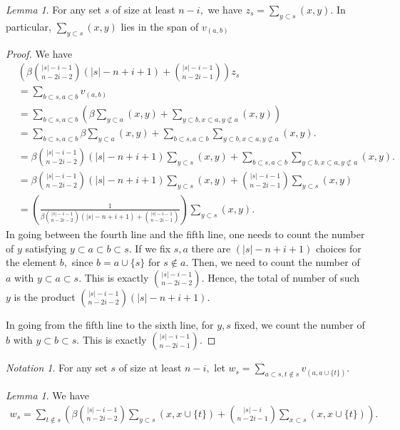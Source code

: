 \documentclass[10 pt]{amsart}
\theoremstyle{plain}
\theoremstyle{definition}
\theoremstyle{remark}
\numberwithin{equation}{section}
\newtheorem{lem}[thm]{Lemma}
\theoremstyle{remark}
\newtheorem{note}[thm]{Notation}
\begin{document}
\begin{lem}
\label{z_equivalence}
For any set $s$ of size at least $n-i,$ we have $z_s = \sum_{y \subset s}^{}(x, y).$ In particular, $\sum_{y \subset s}^{}(x, y)$ lies in the span of $v_{(a, b)}$
\end{lem}
\begin{proof}
We have 
\begin{align*}
	&\left(\beta\binom {|s|-i-1}{n-2i-2}(|s|-n+i+1)+\binom{|s|-i-1}{n-2i-1}\right) z_s \\
	&= \sum_{b\subset s,a \subset b}^{}v_{(a, b)}\\
	&=\sum_{b\subset s,a \subset b}^{} \left(\beta \sum_{y \subset a}^{}(x, y) + \sum_{y\subset b,x \subset a,y\not\subset a}^{}(x, y)\right)\\
	&= \sum_{b\subset s,a \subset b}^{} \beta \sum_{y \subset a}^{}(x, y) + \sum_{b\subset s,a \subset b}^{} \sum_{y\subset b,x \subset a,y\not\subset a}^{}(x, y).\\
	&= \beta\binom {|s|-i-1}{n-2i-2}(|s|-n+i+1) \sum_{y \subset s}^{}(x ,y)+ \sum_{b\subset s,a \subset b}^{} \sum_{y\subset b,x \subset a,y\not\subset a}^{}(x, y).\\
	&= \beta\binom {|s|-i-1}{n-2i-2}(|s|-n+i+1) \sum_{y \subset s}^{}(x ,y) + \binom{|s|-i-1}{n-2i-1}\sum_{y\subset s}^{}(x, y)\\
	& =\left(\frac{1}{\beta\binom {|s|-i-1}{n-2i-2}(|s|-n+i+1)+\binom{|s|-i-1}{n-2i-1}}\right) \sum_{y \subset s}^{}(x,y).
\end{align*}
In going between the fourth line and the fifth line, one needs to count the number of $y$ satisfying $y \subset a \subset b\subset s.$ If we fix $s,a$ there are $(|s|-n+i+1)$ choices for the element $b,$ since $b = a \cup \{s\}$ for $s \notin a.$ Then, we need to count the number of $a$ with $y \subset a \subset s.$ This is exactly $\binom {|s|-i-1}{n-2i-2}.$ Hence, the total of number of such $y$ is the product $\binom {|s|-i-1}{n-2i-2}(|s|-n+i+1).$

In going from the fifth line to the sixth line, for $y,s$ fixed, we count the number of $b$ with $y \subset b \subset s.$ This is exactly $\binom{|s|-i-1}{n-2i-1}$.
\end{proof}

\begin{note}
For any set $s$ of size at least $n-i,$ let $w_s = \sum_{a \subset s,t\notin s}^{}v_{(a, a \cup \{t\})}.$
\end{note}

\begin{lem}
\label{w_equivalence}
We have 
\begin{align*}
	w_s = \sum_{t\notin s}^{} \left(\beta \binom {|s|-i-1}{n-2i-2}	\sum_{y \subset s}^{}(x, x \cup \{t\})  + \binom {|s|-i}{n-2i-1} \sum_{x \subset s}^{}(x ,x \cup \{t\}) \right).
\end{align*}
\end{lem}
\end{document}
